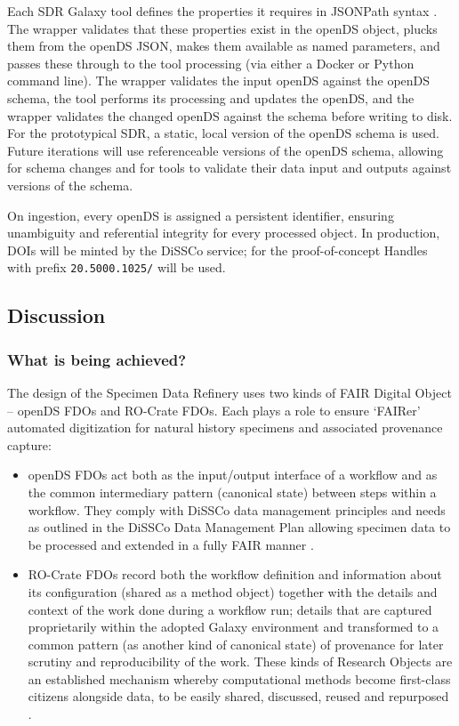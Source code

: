 Each SDR Galaxy tool defines the properties it requires in JSONPath
syntax \cite{ch8-60}. The wrapper validates that these properties exist in
the openDS object, plucks them from the openDS JSON, makes them
available as named parameters, and passes these through to the tool
processing (via either a Docker or Python command line). The wrapper
validates the input openDS against the openDS schema, the tool performs
its processing and updates the openDS, and the wrapper validates the
changed openDS against the schema before writing to disk. For the
prototypical SDR, a static, local version of the openDS schema is used.
Future iterations will use referenceable versions of the openDS schema,
allowing for schema changes and for tools to validate their data input
and outputs against versions of the schema.

On ingestion, every openDS is assigned a persistent identifier, ensuring
unambiguity and referential integrity for every processed object. In
production, DOIs will be minted by the DiSSCo service; for the
proof-of-concept Handles with prefix \texttt{20.5000.1025/} will be
used.

\subsection{Discussion}\label{discussion-2}

\subsubsection{What is being achieved?}\label{what-is-being-achieved}

The design of the Specimen Data Refinery uses two kinds of FAIR Digital
Object -- openDS FDOs and RO-Crate FDOs. Each plays a role to ensure
`FAIRer' automated digitization for natural history specimens and
associated provenance capture:

\begin{itemize}
\item
  openDS FDOs act both as the input/output interface of a workflow and
  as the common intermediary pattern (canonical state) between steps
  within a workflow. They comply with DiSSCo data management principles
  and needs as outlined in the DiSSCo Data Management Plan \cite{ch8-28}
  allowing specimen data to be processed and extended in a fully FAIR
  manner \cite{ch8-6}.
\item
  RO-Crate FDOs record both the workflow definition and information
  about its configuration (shared as a method object) together with the
  details and context of the work done during a workflow run; details
  that are captured proprietarily within the adopted Galaxy environment
  and transformed to a common pattern (as another kind of canonical
  state) of provenance for later scrutiny and reproducibility of the
  work. These kinds of Research Objects \cite{Bechhofer 2013} are an established
  mechanism whereby computational methods become first-class citizens
  alongside data, to be easily shared, discussed, reused and repurposed
  \cite{ch8-57}.
\end{itemize}

